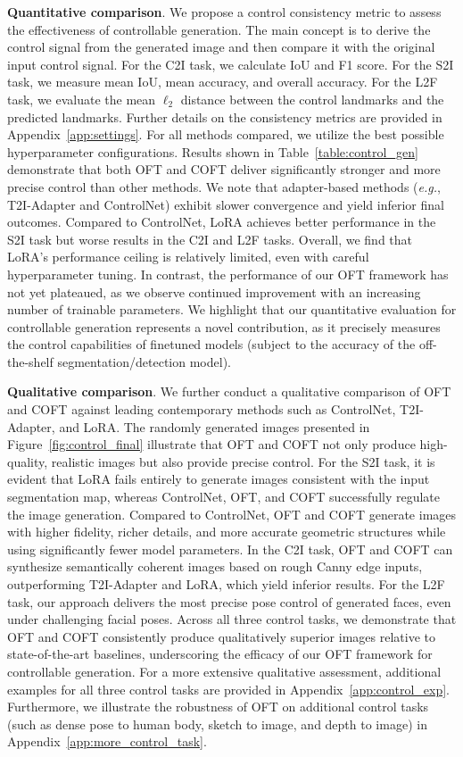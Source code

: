 \textbf{Quantitative comparison}. We propose a control consistency metric to assess the effectiveness of controllable generation. The main concept is to derive the control signal from the generated image and then compare it with the original input control signal. For the C2I task, we calculate IoU and F1 score. For the S2I task, we measure mean IoU, mean accuracy, and overall accuracy. For the L2F task, we evaluate the mean $\ell_2$ distance between the control landmarks and the predicted landmarks. Further details on the consistency metrics are provided in Appendix~\ref{app:settings}. For all methods compared, we utilize the best possible hyperparameter configurations. Results shown in Table~\ref{table:control_gen} demonstrate that both OFT and COFT deliver significantly stronger and more precise control than other methods. We note that adapter-based methods (\emph{e.g.}, T2I-Adapter and ControlNet) exhibit slower convergence and yield inferior final outcomes. Compared to ControlNet, LoRA achieves better performance in the S2I task but worse results in the C2I and L2F tasks. Overall, we find that LoRA’s performance ceiling is relatively limited, even with careful hyperparameter tuning. In contrast, the performance of our OFT framework has not yet plateaued, as we observe continued improvement with an increasing number of trainable parameters. We highlight that our quantitative evaluation for controllable generation represents a novel contribution, as it precisely measures the control capabilities of finetuned models (subject to the accuracy of the off-the-shelf segmentation/detection model).

\textbf{Qualitative comparison}. We further conduct a qualitative comparison of OFT and COFT against leading contemporary methods such as ControlNet, T2I-Adapter, and LoRA. The randomly generated images presented in Figure~\ref{fig:control_final} illustrate that OFT and COFT not only produce high-quality, realistic images but also provide precise control. For the S2I task, it is evident that LoRA fails entirely to generate images consistent with the input segmentation map, whereas ControlNet, OFT, and COFT successfully regulate the image generation. Compared to ControlNet, OFT and COFT generate images with higher fidelity, richer details, and more accurate geometric structures while using significantly fewer model parameters. In the C2I task, OFT and COFT can synthesize semantically coherent images based on rough Canny edge inputs, outperforming T2I-Adapter and LoRA, which yield inferior results. For the L2F task, our approach delivers the most precise pose control of generated faces, even under challenging facial poses. Across all three control tasks, we demonstrate that OFT and COFT consistently produce qualitatively superior images relative to state-of-the-art baselines, underscoring the efficacy of our OFT framework for controllable generation. For a more extensive qualitative assessment, additional examples for all three control tasks are provided in Appendix~\ref{app:control_exp}. Furthermore, we illustrate the robustness of OFT on additional control tasks (such as dense pose to human body, sketch to image, and depth to image) in Appendix~\ref{app:more_control_task}.


